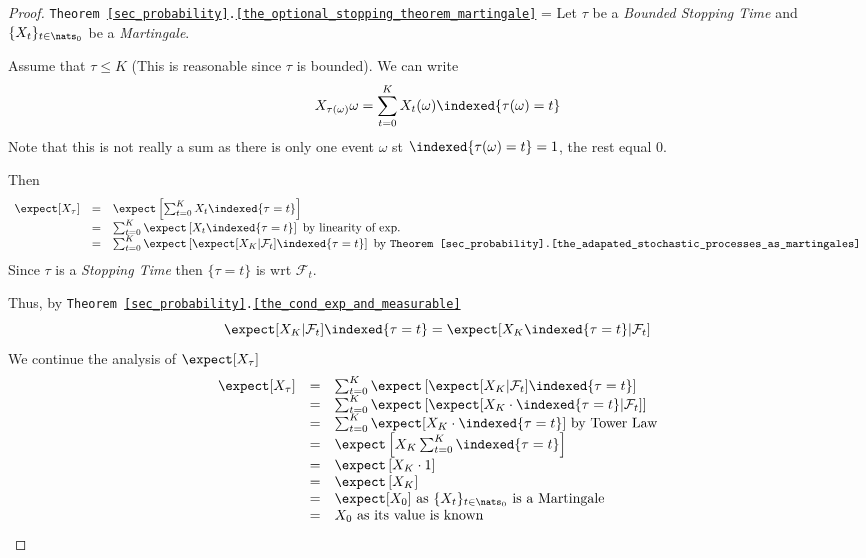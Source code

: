 \documentclass[11pt,a4paper]{article}
\begin{document}
  \begin{proof}{\texttt{Theorem \ref{sec_probability}.\ref{the_optional_stopping_theorem_martingale}}}
    \everymath={\displaystyle}
    Let $\tau$ be a \textit{Bounded Stopping Time} and $\{X_t\}_{t\in\nats_0}$ be a \textit{Martingale}.
    \par Assume that $\tau\leq K$ (This is reasonable since $\tau$ is bounded). We can write
    \[ X_{\tau(\omega)}{\omega}=\sum_{t=0}^KX_t(\omega)\indexed\{\tau(\omega)=t\} \]
    Note that this is not really a sum as there is only one event $\omega$ st $\indexed\{\tau(\omega)=t\}=1$, the rest equal 0.
    \par Then
    \[\begin{array}{rcl}
      \expect[X_\tau]&=&\expect\left[\sum_{t=0}^KX_t\indexed\{\tau=t\}\right]\\
      &=&\sum_{t=0}^K\expect\left[X_t\indexed\{\tau=t\}\right]\text{ by linearity of exp.}\\
      &=&\sum_{t=0}^K\expect\left[\expect[X_K|\mathcal{F}_t]\indexed\{\tau=t\}\right]\text{ by \texttt{Theorem \ref{sec_probability}.\ref{the_adapated_stochastic_processes_as_martingales}}}
    \end{array}\]
    Since $\tau$ is a \textit{Stopping Time} then $\{\tau=t\}$ is  wrt $\mathcal{F}_t$.
    \par Thus, by \texttt{Theorem \ref{sec_probability}.\ref{the_cond_exp_and_measurable}}
    \[ \expect[X_K|\mathcal{F}_t]\indexed\{\tau=t\}=\expect[X_K\indexed\{\tau=t\}|\mathcal{F}_t] \]
    We continue the analysis of $\expect[X_\tau]$
    \[\begin{array}{rcl}
    \expect[X_\tau]&=&\sum_{t=0}^K\expect\left[\expect[X_K|\mathcal{F}_t]\indexed\{\tau=t\}\right]\\
    &=&\sum_{t=0}^K\expect\left[\expect[X_K\cdot \indexed\{\tau=t\}|\mathcal{F}_t]\right]\\
    &=&\sum_{t=0}^K\expect[X_K\cdot \indexed\{\tau=t\}]\text{ by Tower Law}\\
    &=&\expect\left[X_K\sum_{t=0}^K\indexed\{\tau=t\}\right]\\
    &=&\expect\left[X_K\cdot1\right]\\
    &=&\expect\left[X_K\right]\\
    &=&\expect[X_0]\text{ as }\{X_t\}_{t\in\nats_0}\text{ is a Martingale}\\
    &=&X_0\text{ as its value is known}
    \end{array}\]
  \end{proof}
\end{document}
